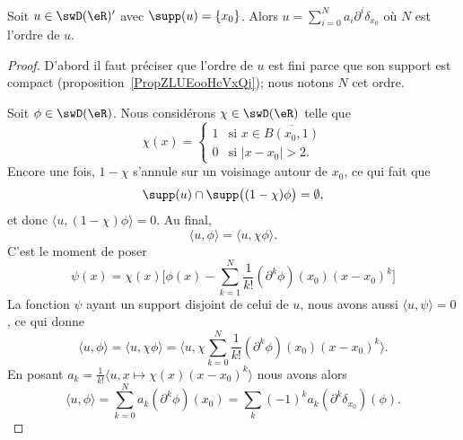 \begin{proposition}     \label{PropXXPLooSkgxOz}
    Soit \( u\in\swD(\eR)'\) avec \( \supp(u)=\{ x_0 \}\). Alors \( u=\sum_{i=0}^{N}a_i\partial^i\delta_{x_0}\) où \( N\) est l'ordre de \( u\).
\end{proposition}

\begin{proof}
    D'abord il faut préciser que l'ordre de \( u\) est fini parce que son support est compact (proposition~\ref{PropZLUEooHcVxQj}); nous notons \( N\) cet ordre.

    Soit \( \phi\in\swD(\eR)\).  Nous considérons \( \chi\in\swD(\eR)\) telle que
    \begin{equation}
        \chi(x)=\begin{cases}
            1    &   \text{si } x\in\overline{ B(x_0,1) }\\
            0    &    \text{si } | x-x_0 |>2.
        \end{cases}
    \end{equation}
    Encore une fois, \( 1-\chi\) s'annule sur un voisinage autour de \( x_0\), ce qui fait que
    \begin{equation}
        \supp(u)\cap\supp\big( (1-\chi)\phi \big)=\emptyset,
    \end{equation}
    et donc \( \langle u, (1-\chi)\phi\rangle =0\). Au final,
    \begin{equation}
        \langle u, \phi\rangle =\langle u, \chi\phi\rangle.
    \end{equation}
    C'est le moment de poser
    \begin{equation}
        \psi(x)=\chi(x)\big[   \phi(x)-\sum_{k=1}^N\frac{1}{ k! }(\partial^k\phi)(x_0)(x-x_0)^k \big]
    \end{equation}
    La fonction \( \psi\) ayant un support disjoint de celui de \( u\), nous avons aussi \( \langle u, \psi\rangle =0\), ce qui donne
    \begin{equation}
        \langle u, \phi\rangle =\langle u, \chi\phi\rangle =\langle u, \chi\sum_{k=0}^N\frac{1}{ k! }(\partial^k\phi)(x_0)(x-x_0)^k\rangle .
    \end{equation}
    En posant \( a_k=\frac{1}{ k! }\langle u, x\mapsto \chi(x)(x-x_0)^k\rangle \) nous avons alors
    \begin{equation}
        \langle u, \phi\rangle =\sum_{k=0}^Na_k(\partial^k\phi)(x_0)=\sum_k(-1)^ka_k(\partial^k\delta_{x_0})(\phi).
    \end{equation}
\end{proof}

